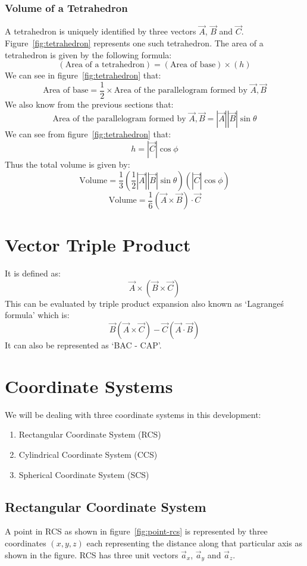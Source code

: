             \subsubsection{Volume of a Tetrahedron}
                
                A tetrahedron is uniquely identified by three vectors $\vec{A}$, $\vec{B}$ and $\vec{C}$. Figure~\ref{fig:tetrahedron} represents one such tetrahedron. The area of a tetrahedron is given by the following formula:
                $$\left(\textrm{Area of a tetrahedron}\right)=\left(\textrm{Area of base}\right)\times(h)$$
                We can see in figure~\ref{fig:tetrahedron} that:
                $$\textrm{Area of base} = \frac{1}{2}\times\textrm{Area of the parallelogram formed by }\vec{A}, \vec{B}$$
                We also know from the previous sections that:
                $$\textrm{Area of the parallelogram formed by }\vec{A}, \vec{B} = |\vec{A}||\vec{B}|\sin\theta$$
                We can see from figure~\ref{fig:tetrahedron} that:
                $$h = |\vec{C}|\cos\phi$$
                Thus the total volume is given by:
                $$\textrm{Volume} = \frac{1}{3}\left(\frac{1}{2}|\vec{A}||\vec{B}|\sin\theta\right)\left(|\vec{C}|\cos\phi\right)$$
                $$\textrm{Volume} = \frac{1}{6}\left(\vec{A}\times\vec{B}\right)\cdot\vec{C}$$
    \section{Vector Triple Product}
        It is defined as: $$\vec{A}\times \left(\vec{B}\times\vec{C}\right)$$
        This can be evaluated by triple product expansion also known as `Lagrange\'s formula' which is:
        $$\vec{B}\left(\vec{A}\times\vec{C}\right) - \vec{C}\left(\vec{A}\cdot\vec{B}\right)$$
        It can also be represented as `BAC - CAP'.
    \section{Coordinate Systems}
        We will be dealing with three coordinate systems in this development:
        \begin{enumerate}
            \item Rectangular Coordinate System (RCS)
            \item Cylindrical Coordinate System (CCS)
            \item Spherical Coordinate System (SCS)
        \end{enumerate}
        \subsection{Rectangular Coordinate System}
            
            A point in RCS as shown in figure~\ref{fig:point-rcs} is represented by three coordinates $\left(x, y, z\right)$ each representing the distance along that particular axis as shown in the figure. RCS has three unit vectors $\vec{a}_x$, $\vec{a}_y$ and $\vec{a}_z$.
